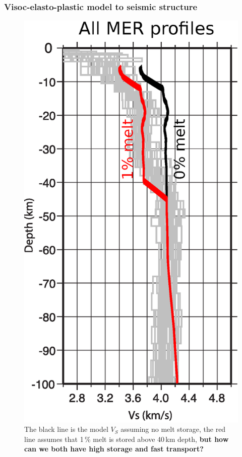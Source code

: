 \documentclass[aspectratio=169]{beamer}
\begin{document}
\begin{frame}
    \frametitle{Visoc-elasto-plastic model to seismic structure}
    \begin{figure}
        \includegraphics[height=0.5\paperheight]{./figures/MER2.png}
        \caption{The black line is the model $V_{S}$ assuming no melt storage, the red line
                 assumes that 1\,\% melt is stored above 40\,km depth, {\bf but how can we both have high storage and fast transport?}}
    \end{figure}
\end{frame}
\end{document}
